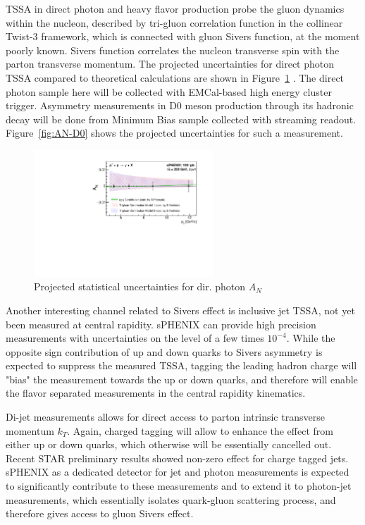 TSSA in direct photon and heavy flavor production probe the gluon dynamics within the nucleon, described by tri-gluon correlation function in the collinear Twist-3 framework, which is connected with gluon Sivers function, at the moment poorly known. Sivers function correlates the nucleon transverse spin with the parton transverse
momentum. The projected uncertainties for direct photon TSSA compared to theoretical calculations are shown in Figure~\ref{fig:AN_dp} . The direct photon sample here will be collected with EMCal-based high energy cluster trigger. Asymmetry measurements in D0 meson production through its hadronic decay will be done from Minimum Bias sample collected with streaming readout. Figure~\ref{fig:AN-D0} shows the projected uncertainties for such a measurement.

\begin{figure}[htbp]
\centering
\includegraphics[width=0.60\textwidth]{figs/AN_dp_sphenix.pdf}
\caption{Projected statistical uncertainties for dir. photon $A_N$}
\label{fig:AN_dp}
\end{figure}

Another interesting channel related to Sivers effect is inclusive jet TSSA, not yet been measured at central rapidity. sPHENIX can provide high precision measurements with uncertainties on the level of a few times $10^{-4}$. While the opposite sign contribution of up and down quarks to Sivers asymmetry is expected to suppress the measured TSSA, tagging the leading hadron charge will "bias" the measurement towards the up or down quarks, and therefore will enable the flavor separated measurements in the central rapidity kinematics.

Di-jet measurements allows for direct access to parton intrinsic transverse momentum $k_T$. Again, charged tagging will allow to enhance the effect from either up or down quarks, which otherwise will be essentially cancelled out. Recent STAR preliminary results showed non-zero effect for charge tagged jets. sPHENIX as a dedicated detector for jet and photon measurements is expected to significantly contribute to these measurements and to extend it to photon-jet measurements, which essentially isolates quark-gluon scattering process, and therefore gives access to gluon Sivers effect.

